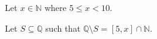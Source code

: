 \documentclass{article}
\begin{document}
Let $x \in \mathbb{N}$ where $5 \leq x < 10$.

Let $S \subseteq \mathbb{Q}$ such that $\mathbb{Q} \setminus S = [5, x] \cap \mathbb{N}$.
\end{document}
